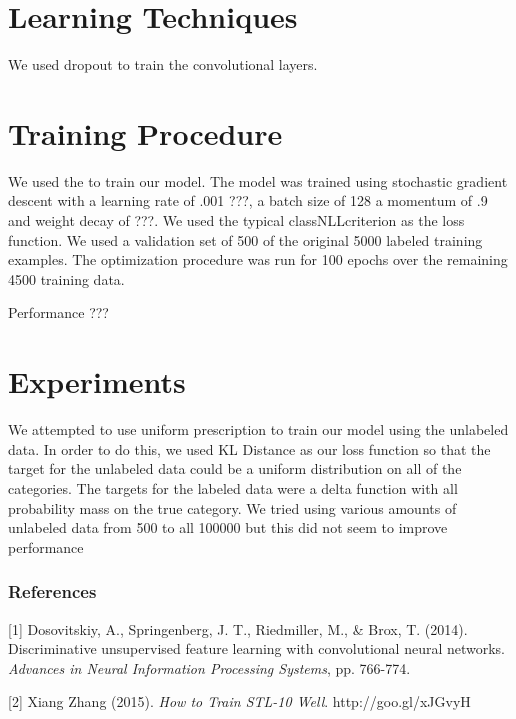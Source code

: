 \documentclass{article} %
\begin{document}
\section{Learning Techniques}

We used dropout to train the convolutional layers.

\section{Training Procedure}

We used the to train our model. The model was trained 
using stochastic gradient descent with a learning rate of .001 ???,
a batch size of 128 a momentum of .9 and weight decay of ???.  We
used the typical classNLLcriterion as the loss function. We used a validation set of 500 
of the original 5000 labeled training examples. The optimization procedure was run for 
100 epochs over the remaining 4500 training data.

Performance ???

\section{Experiments}

We attempted to use uniform prescription to train our model using the unlabeled data. In order to 
do this, we used KL Distance as our loss function so that the target for the unlabeled data could be
a uniform distribution on all of the categories. The targets for the labeled data were a delta function
with all probability mass on the true category. We tried using various amounts of unlabeled data from
500 to all 100000 but this did not seem to improve performance

\subsubsection*{References}

\small{
[1] Dosovitskiy, A., Springenberg, J. T., Riedmiller, M., \& Brox, T. (2014). Discriminative unsupervised feature learning with convolutional neural networks. {\it Advances in Neural Information Processing Systems}, pp. 766-774.

[2] Xiang Zhang (2015). {\it How to Train STL-10 Well}. http://goo.gl/xJGvyH
}
\end{document}
